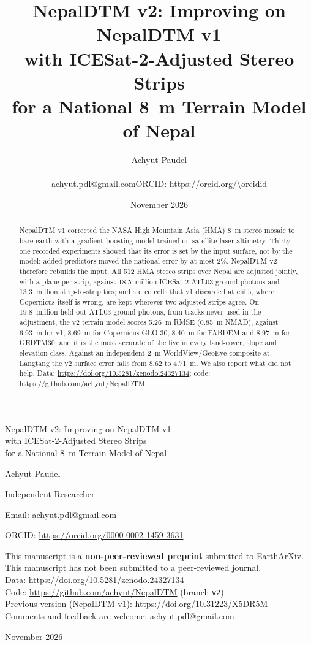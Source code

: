 \documentclass[11pt]{article}
\title{NepalDTM v2: Improving on NepalDTM v1\\
with ICESat-2-Adjusted Stereo Strips\\
for a National 8~m Terrain Model of Nepal}
\author{Achyut Paudel\\
\small \affil\\
\small \href{mailto:achyut.pdl@gmail.com}{achyut.pdl@gmail.com}\quad ORCID: \url{https://orcid.org/\orcidid}}
\date{November 2026}
\newcommand{\orcidid}{0000-0002-1459-3631}%
\newcommand{\affil}{Independent Researcher}%
\newcommand{\journalnote}{This manuscript has not been submitted to a peer-reviewed journal.}
\begin{document}
\begin{titlepage}
\centering
\vspace*{2cm}
{\LARGE NepalDTM v2: Improving on NepalDTM v1\\[2pt] with ICESat-2-Adjusted Stereo Strips\\[2pt]
for a National 8~m Terrain Model of Nepal\par}
\vspace{1.5cm}
{\large Achyut Paudel\par}
\vspace{4pt}
\affil\par
Email: \href{mailto:achyut.pdl@gmail.com}{achyut.pdl@gmail.com}\par
ORCID: \url{https://orcid.org/\orcidid}\par
\vspace{1.5cm}
\begin{minipage}{0.82\textwidth}
\centering
This manuscript is a \textbf{non-peer-reviewed preprint} submitted to EarthArXiv.\\[4pt]
\journalnote\\[12pt]
Data: \url{https://doi.org/10.5281/zenodo.24327134}\\
Code: \url{https://github.com/achyut/NepalDTM} (branch \texttt{v2})\\
Previous version (NepalDTM v1): \url{https://doi.org/10.31223/X5DR5M}\\[12pt]
Comments and feedback are welcome: \href{mailto:achyut.pdl@gmail.com}{achyut.pdl@gmail.com}
\end{minipage}
\vfill
{\small November 2026\par}
\end{titlepage}
\setcounter{page}{1}
\maketitle

\begin{abstract}
NepalDTM v1 corrected the NASA High Mountain Asia (HMA) 8~m stereo mosaic to bare earth with a gradient-boosting
model trained on satellite laser altimetry. Thirty-one recorded experiments showed that its error is set by the
input surface, not by the model: added predictors moved the national error by at most 2\%.
NepalDTM v2 therefore rebuilds the input. All 512 HMA stereo strips over Nepal are adjusted jointly, with a plane
per strip, against 18.5~million ICESat-2 ATL03 ground photons and 13.3~million strip-to-strip ties; and stereo
cells that v1 discarded at cliffs, where Copernicus itself is wrong, are kept wherever two adjusted strips agree.
On 19.8~million held-out ATL03 ground photons, from tracks never used in the adjustment, the v2 terrain model
scores 5.26~m RMSE (0.85~m NMAD), against 6.93~m for v1, 8.69~m for Copernicus GLO-30, 8.40~m for FABDEM and
8.97~m for GEDTM30, and it is the most accurate of the five in every land-cover, slope and elevation class.
Against an independent 2~m WorldView/GeoEye composite at Langtang the v2 surface error falls from 8.62 to 4.71~m.
We also report what did not help.
Data: \url{https://doi.org/10.5281/zenodo.24327134}; code: \url{https://github.com/achyut/NepalDTM}.
\end{abstract}
\end{document}
